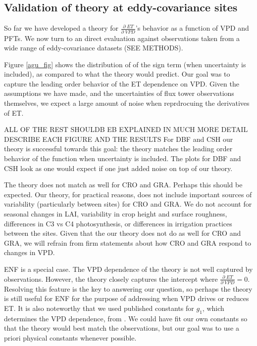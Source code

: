 \documentclass[draft,linenumbers]{agujournal}
\begin{document}
\subsection{Validation of theory at eddy-covariance sites}
\label{testing}
So far we have developed a theory for $\frac{\partial \; ET}{\partial \; VPD}$'s behavior as a function of VPD and PFTs. We now turn to an direct evaluation against observations taken from a wide range of eddy-covariance datasets (SEE METHODS).

Figure \ref{agu_fig} shows the distribution of of the sign term (when uncertainty is included), as compared to what the theory would predict. Our goal  was to capture the leading order behavior of the ET dependence on VPD. Given the assumptions we have made, and the uncertainties of flux tower observations themselves, we expect a large amount of noise when reprdrocuing the derivatives of ET.

ALL OF THE REST SHOULDB EB EXPLAINED IN MUCH MORE DETAIL DESCRIBE EACH FIGURE AND THE RESULTS For DBF and CSH our theory is successful towards this goal: the theory matches the leading order behavior of the function when uncertainty is included.  The plots for DBF and CSH look as one would expect if one just added noise on top of our theory.

The theory does not match as well for CRO and GRA. Perhaps this should be expected. Our theory, for practical reasons, does not include important sources of variability (particularly between sites) for CRO and GRA. We do not account for seasonal changes in LAI, variability in crop height and surface roughness, differences in C3 vs C4 photosynthesis, or differences in irrigation practices between the sites. Given that the our theory does not do as well for CRO and GRA, we will refrain from firm statements about how CRO and GRA respond to changes in VPD.

ENF is a special case. The VPD dependence of the theory is not well captured by observations. However, the theory closely captures the intercept where $\frac{\partial \; ET}{\partial \; VPD} = 0$. Resolving this feature is the key to answering our question, so perhaps the theory is still useful for ENF for the purpose of addressing when VPD drives or reduces ET. It is also noteworthy that we used published constants for $g_1$, which determines the VPD dependence, from \cite{Lin_2015}. We could have fit our own constants so that the theory would best match the observations, but our goal was to use a priori physical constants whenever possible.
\end{document}
